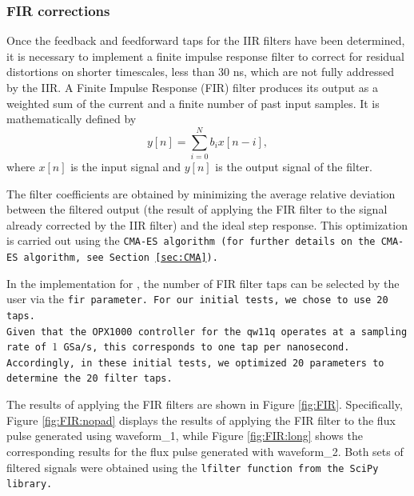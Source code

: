 \subsubsection{FIR corrections}
Once the feedback and feedforward taps for the IIR filters have been determined, it is necessary to implement a finite impulse response filter to correct for residual distortions on shorter timescales, less than 30 ns, which are not fully addressed by the IIR.
A Finite Impulse Response (FIR) filter produces its output as a weighted sum of the current and a finite number of past input samples. It is mathematically defined by
\begin{equation}
        y[n] = \sum_{i=0}^{N} b_i x[n - i],
\end{equation}
where $x[n]$ is the input signal and $y[n]$ is the output signal of the filter.

The filter coefficients are obtained by minimizing the average relative deviation between the filtered output (the result of applying the FIR filter to the signal already corrected by the IIR filter) and the ideal step response. 
This optimization is carried out using the \tt{CMA-ES} algorithm (for further details on the \tt{CMA-ES} algorithm, see Section \ref{sec:CMA}).

In the implementation for \Qibocal, the number of FIR filter taps can be selected by the user via the \tt{fir} parameter. 
For our initial tests, we chose to use 20 taps.\\
Given that the OPX1000 controller for the qw11q operates at a sampling rate of $1$ GSa/s, this corresponds to one tap per nanosecond. 
Accordingly, in these initial tests, we optimized 20 parameters to determine the 20 filter taps.

The results of applying the FIR filters are shown in Figure \ref{fig:FIR}. 
Specifically, Figure \ref{fig:FIR:nopad} displays the results of applying the FIR filter to the flux pulse generated using waveform\_1, while Figure \ref{fig:FIR:long} shows the corresponding results for the flux pulse generated with waveform\_2. 
Both sets of filtered signals were obtained using the \tt{lfilter} function from the \tt{SciPy} library.

